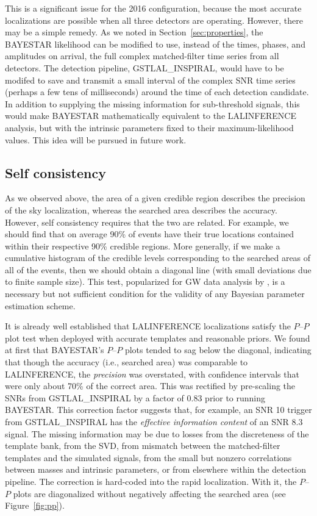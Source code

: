 \documentclass[amsmath,amssymb,aps,prx,reprint,nopreprintnumbers,nofootinbib,showpacs]{revtex4-1}
\begin{document}
This is a significant issue for the 2016 configuration, because the most accurate localizations are possible when all three detectors are operating. However, there may be a simple remedy. As we noted in Section~\ref{sec:properties}, the \ac{BAYESTAR} likelihood can be modified to use, instead of the times, phases, and amplitudes on arrival, the full complex matched\nobreakdashes-filter time series from all detectors. The detection pipeline, GSTLAL\_INSPIRAL, would have to be modifed to save and transmit a small interval of the complex \ac{SNR} time series (perhaps a few tens of milliseconds) around the time of each detection candidate. In addition to supplying the missing information for sub\nobreakdashes-threshold signals, this would make \ac{BAYESTAR} mathematically equivalent to the LALINFERENCE analysis, but with the intrinsic parameters fixed to their maximum\nobreakdashes-likelihood values. This idea will be pursued in future work.

\subsection{Self consistency}

As we observed above, the area of a given credible region describes the precision of the sky localization, whereas the searched area describes the accuracy. However, self consistency requires that the two are related. For example, we should find that on average 90\% of events have their true locations contained within their respective 90\% credible regions. More generally, if we make a cumulative histogram of the credible levels corresponding to the searched areas of all of the events, then we should obtain a diagonal line (with small deviations due to finite sample size). This test, popularized for \ac{GW} data analysis by \cite{SiderySkyLocalizationComparison}, is a necessary but not sufficient condition for the validity of any Bayesian parameter estimation scheme.

It is already well established that LALINFERENCE localizations satisfy the $P$\nobreakdashes--$P$ plot test when deployed with accurate templates and reasonable priors. We found at first that \ac{BAYESTAR}'s $P$\nobreakdashes--$P$ plots tended to sag below the diagonal, indicating that though the accuracy (i.e., searched area) was comparable to LALINFERENCE, the \emph{precision} was overstated, with confidence intervals that were only about 70\% of the correct area. This was rectified by pre\nobreakdashes-scaling the \acp{SNR} from GSTLAL\_INSPIRAL by a factor of 0.83 prior to running \ac{BAYESTAR}. This correction factor suggests that, for example, an \ac{SNR} 10 trigger from GSTLAL\_INSPIRAL has the \emph{effective information content} of an \ac{SNR} 8.3 signal. The missing information may be due to losses from the discreteness of the template bank, from the \ac{SVD}, from mismatch between the matched\nobreakdashes-filter templates and the simulated signals, from the small but nonzero correlations between masses and intrinsic parameters, or from elsewhere within the detection pipeline. The correction is hard\nobreakdashes-coded into the rapid localization. With it, the $P$\nobreakdashes--$P$ plots are diagonalized without negatively affecting the searched area (see Figure~\ref{fig:pp}).
\end{document}
